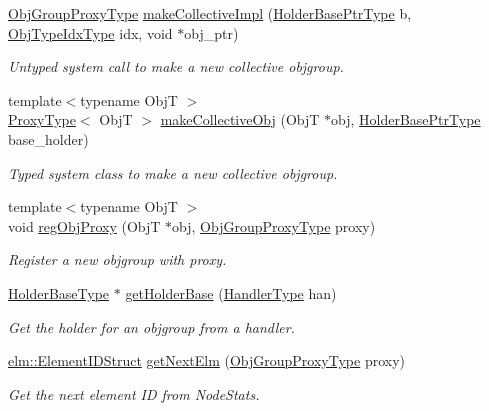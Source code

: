 \begin{DoxyCompactItemize}
\item 
\hyperlink{namespacevt_ad7cae989df485fccca57f0792a880a8e}{Obj\+Group\+Proxy\+Type} \hyperlink{structvt_1_1objgroup_1_1_obj_group_manager_ab9885f22f148479bb68f3a59a147cdec}{make\+Collective\+Impl} (\hyperlink{structvt_1_1objgroup_1_1_obj_group_manager_ac1e9bb19d4a5923dd6d595bad28f04c9}{Holder\+Base\+Ptr\+Type} b, \hyperlink{namespacevt_1_1objgroup_a378e4b966221779c74f3a2f921eb2421}{Obj\+Type\+Idx\+Type} idx, void $\ast$obj\+\_\+ptr)
\begin{DoxyCompactList}\small\item\em Untyped system call to make a new collective objgroup. \end{DoxyCompactList}\item 
{\footnotesize template$<$typename ObjT $>$ }\\\hyperlink{structvt_1_1objgroup_1_1_obj_group_manager_aea65eef52f240a52210132eef5ce591f}{Proxy\+Type}$<$ ObjT $>$ \hyperlink{structvt_1_1objgroup_1_1_obj_group_manager_af5a05ad71853f2805cad4e08c2cedabe}{make\+Collective\+Obj} (ObjT $\ast$obj, \hyperlink{structvt_1_1objgroup_1_1_obj_group_manager_ac1e9bb19d4a5923dd6d595bad28f04c9}{Holder\+Base\+Ptr\+Type} base\+\_\+holder)
\begin{DoxyCompactList}\small\item\em Typed system class to make a new collective objgroup. \end{DoxyCompactList}\item 
{\footnotesize template$<$typename ObjT $>$ }\\void \hyperlink{structvt_1_1objgroup_1_1_obj_group_manager_a73d5d6f3f63c1243d7f0ea11f33a4661}{reg\+Obj\+Proxy} (ObjT $\ast$obj, \hyperlink{namespacevt_ad7cae989df485fccca57f0792a880a8e}{Obj\+Group\+Proxy\+Type} proxy)
\begin{DoxyCompactList}\small\item\em Register a new objgroup with proxy. \end{DoxyCompactList}\item 
\hyperlink{structvt_1_1objgroup_1_1_obj_group_manager_a4898fc9cabf44890e5593f8c4ab86230}{Holder\+Base\+Type} $\ast$ \hyperlink{structvt_1_1objgroup_1_1_obj_group_manager_a5e471b3448e27e86697dcbb00e053230}{get\+Holder\+Base} (\hyperlink{namespacevt_af64846b57dfcaf104da3ef6967917573}{Handler\+Type} han)
\begin{DoxyCompactList}\small\item\em Get the holder for an objgroup from a handler. \end{DoxyCompactList}\item 
\hyperlink{structvt_1_1elm_1_1_element_i_d_struct}{elm\+::\+Element\+I\+D\+Struct} \hyperlink{structvt_1_1objgroup_1_1_obj_group_manager_a0ebea4ad5b94becdeefe688d75f78142}{get\+Next\+Elm} (\hyperlink{namespacevt_ad7cae989df485fccca57f0792a880a8e}{Obj\+Group\+Proxy\+Type} proxy)
\begin{DoxyCompactList}\small\item\em Get the next element ID from {\ttfamily Node\+Stats}. \end{DoxyCompactList}\end{DoxyCompactItemize}
